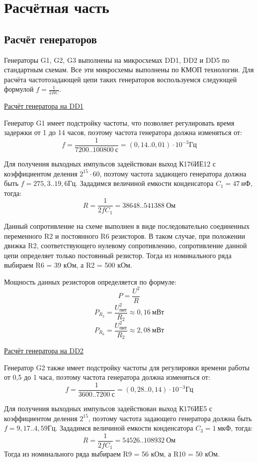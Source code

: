 \section{Расчётная часть}

\subsection*{Расчёт генераторов}

Генераторы G1, G2, G3 выполнены на микросхемах DD1, DD2 и DD5 по стандартным схемам. Все эти микросхемы выполнены по КМОП технологии. Для расчёта частотозадающей цепи таких генераторов воспользуемся следующей формулой $f=\frac{1}{2RC}$. 

\underline{Расчёт генератора на DD1}

Генератор G1 имеет подстройку частоты, что позволяет регулировать время задержки от 1 до 14 часов, поэтому частота генератора должна изменяться от: \[f=\frac{1}{7200..100800~\text{с}}=(0,14..0,01)\cdot10^{-3} \text{Гц}\]

Для получения выходных импульсов задействован выход К176ИЕ12 с коэффициентом деления $2^{15}\cdot60$, поэтому частота задающего генератора должна быть $f= 275,3..19,6 \text{Гц}$. Зададимся величиной емкости конденсатора $C_1 = 47~ \text{нФ}$, тогда: \[R=\frac{1}{2fC_1}=38648..541388~\text{Ом}\]

Данный сопротивление на схеме выполнен в виде последовательно соединенных переменного R2 и постоянного R6 резисторов. В таком случае, при положении движка R2, соответствующего нулевому сопротивлению, сопротивление данной цепи определяет только постоянный резистор. Тогда из номинального ряда выбираем R6 = 39 кОм, а R2 = 500 кОм. 

Мощность данных резисторов определяется по формуле: \[P=\frac{U^2}{R}\]
\[P_{R_2}=\frac{U^2_{\text{пит}}}{R_2} \approx 0,16~\text{мВт}\]
\[P_{R_6}=\frac{U^2_{\text{пит}}}{R_2} \approx 2,08~\text{мВт}\]

\underline{Расчёт генератора на DD2}

Генератор G2 также имеет подстройку частоты для регулировки времени работы от 0,5 до 1 часа, поэтому частота генератора должна изменяться от: \[f=\frac{1}{3600..7200~\text{с}}=(0,28..0,14)\cdot10^{-3} \text{Гц}\]

Для получения выходных импульсов задействован выход К176ИЕ5 с коэффициентом деления $2^{15}$, поэтому частота задающего генератора должна быть $f= 9,17..4,59 \text{Гц}$. Зададимся величиной емкости конденсатора $C_3 = 1~ \text{мкФ}$, тогда: \[R=\frac{1}{2fC_1}=54526..108932~\text{Ом}\]
Тогда из номинального ряда выбираем R9 = 56 кОм, а R10 = 50 кОм. 

